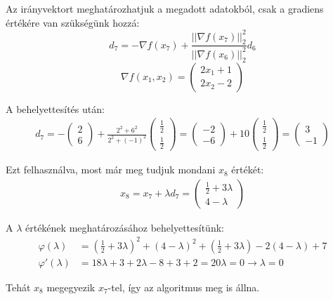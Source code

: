 \begin{megoldas}
Az irányvektort meghatározhatjuk a megadott adatokból, csak a gradiens értékére van szükségünk hozzá:
$$d_7=-\nabla f(x_7)+\frac{||\nabla f(x_{7})||_2^2}{||\nabla f(x_6)||_2^2}d_6$$
$$\nabla f(x_1,x_2)=\left(\begin{array}{c}2x_1+1\\2x_2-2\end{array}\right)$$

A behelyettesítés után:
\begin{align*}d_7=-\left(\begin{array}{c}2\\[0.3em]6\end{array}\right)+\frac{2^2+6^2}{2^2+(-1)^2}\left(\begin{array}{c}\frac{1}{2}\\[0.3em]\frac{1}{2}\end{array}\right)= \left(\begin{array}{c}-2\\[0.3em]-6\end{array}\right)+10\left(\begin{array}{c}\frac{1}{2}\\[0.3em]\frac{1}{2}\end{array}\right)=\left(\begin{array}{c}3\\[0.3em]-1\end{array}\right)\end{align*}

Ezt felhasználva, most már meg tudjuk mondani $x_8$ értékét:
\begin{align*}x_8=x_7+\lambda d_7=\left(\begin{array}{c}\frac{1}{2}+3\lambda\\[0.3em]4-\lambda\end{array}\right)\end{align*}

A $\lambda$ értékének meghatározásához behelyettesítünk:
\begin{align*}
\varphi(\lambda)&=(\tfrac{1}{2}+3\lambda)^2+(4-\lambda)^2+(\tfrac{1}{2}+3\lambda)-2(4-\lambda)+7\\
\varphi'(\lambda)&=18\lambda+3+2\lambda-8+3+2=20\lambda = 0 \longrightarrow \lambda=0
\end{align*}

Tehát $x_8$ megegyezik $x_7$-tel, így az algoritmus meg is állna.
\end{megoldas}
